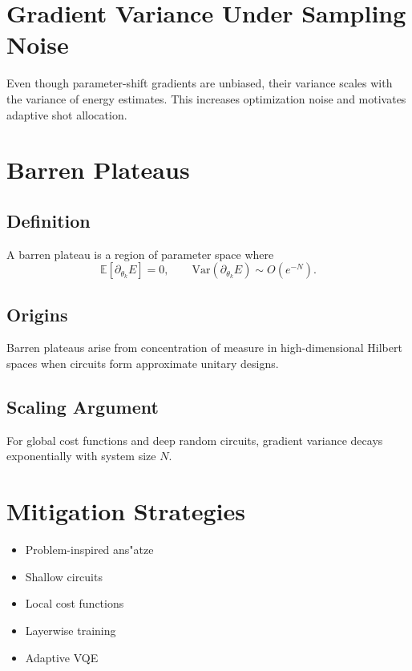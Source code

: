 \documentclass{book}
\begin{document}
\section{Gradient Variance Under Sampling Noise}

Even though parameter-shift gradients are unbiased, their variance scales with the variance of energy estimates. This increases optimization noise and motivates adaptive shot allocation.

\section{Barren Plateaus}

\subsection{Definition}

A barren plateau is a region of parameter space where
\begin{equation}
\mathbb{E}[\partial_{\theta_k} E] = 0, \qquad \mathrm{Var}(\partial_{\theta_k} E) \sim O(e^{-N}).
\end{equation}

\subsection{Origins}

Barren plateaus arise from concentration of measure in high-dimensional Hilbert spaces when circuits form approximate unitary designs.

\subsection{Scaling Argument}

For global cost functions and deep random circuits, gradient variance decays exponentially with system size $N$.

\section{Mitigation Strategies}

\begin{itemize}
\item Problem-inspired ans"atze
\item Shallow circuits
\item Local cost functions
\item Layerwise training
\item Adaptive VQE
\end{itemize}
\end{document}
